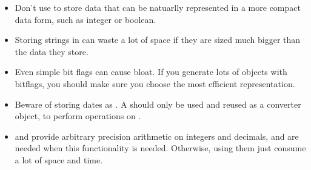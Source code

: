 \begin{itemize}
  \item  Don't use  to store data that can be natuarlly
  represented in a more compact data form, such as integer or boolean.
  \item Storing strings in  can waste a lot of space
  if they are sized much bigger than the data they store.
  \item Even simple bit flags can cause bloat. If you generate lots of objects
  with bitflags, you should make sure you choose the most efficient
  representation.
  \item Beware of storing dates as .  A
   should only be used and reused as a converter
  object, to perform operations on .
  \item {} and  provide arbitrary precision
  arithmetic on integers and decimals, and are needed when this functionality is
  needed. Otherwise, using them just consume a lot of space and time.
\end{itemize}









